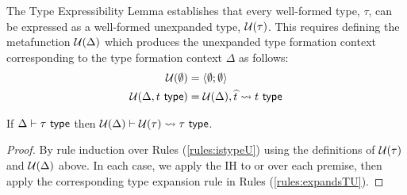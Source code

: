 The Type Expressibility Lemma establishes that every well-formed type, $\tau$, can be expressed as a well-formed unexpanded type, $\mathcal{U}(\tau)$. This requires defining the metafunction $\mathcal{U}(\Delta)$ which produces the unexpanded type formation context corresponding to the type formation context $\Delta$ as follows:
\begin{align*}
\mathcal{U}(\emptyset) &= \langle \emptyset; \emptyset \rangle\\
\mathcal{U}(\Delta, t~\mathsf{type}) &= \mathcal{U}(\Delta), \widehat{t} \leadsto t~\mathsf{type}
\end{align*}
\begin{lemma}\label{lemma:type-expressibility} If $\Delta \vdash \tau~\mathsf{type}$ then $\mathcal{U}(\Delta) \vdash \mathcal{U}(\tau) \leadsto \tau~\mathsf{type}$.\end{lemma}
\begin{proof} By rule induction over Rules (\ref{rules:istypeU}) using the definitions of $\mathcal{U}(\tau)$ and $\mathcal{U}(\Delta)$ above. In each case, we apply the IH to or over each premise, then apply the corresponding type expansion rule in Rules (\ref{rules:expandsTU}).\end{proof}

